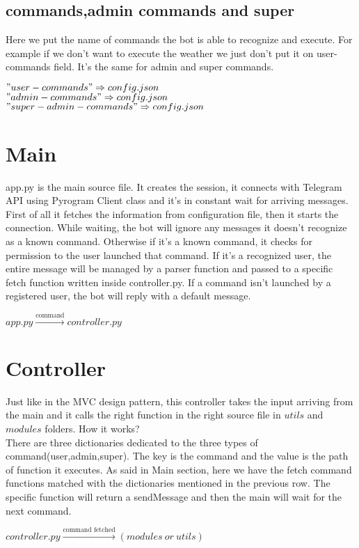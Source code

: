 \documentclass{article}
\begin{document}
\subsection{commands,admin commands and super}
Here we put the name of commands the bot is able to recognize and execute. For example if we don't want to execute the weather we just don't put it on user-commands field. It's the same for admin and super commands.
\begin{center} $"user-commands" \Rightarrow config.json$ \\
               $"admin-commands" \Rightarrow config.json$ \\
               $"super-admin-commands" \Rightarrow config.json$
\end{center}

\section{Main}
app.py is the main source file. It creates the session, it connects with Telegram API using Pyrogram Client class and it's in constant wait for arriving messages.
First of all it fetches the information from configuration file, then it starts the connection.
While waiting, the bot will ignore any messages it doesn't recognize as a known command. Otherwise if it's a known command, it checks for permission to the user launched that command. If it's a recognized user, the entire message will be managed by a parser function and passed to a specific fetch function written inside controller.py.
If a command isn't launched by a registered user, the bot will reply with a default message.
\begin{center} $app.py \xrightarrow{\text{command}} controller.py$ \end{center}

\section{Controller}
Just like in the MVC design pattern, this controller takes the input arriving from the main and it calls the right function in the right source file in $utils$ and $modules$ folders. How it works? \\
There are three dictionaries dedicated to the three types of command(user,admin,super). The key is the command and the value is the path of function it executes. As said in Main section, here we have the fetch command functions matched with the dictionaries mentioned in the previous row. The specific function will return a sendMessage and then the main will wait for the next command.
\begin{center} $controller.py \xrightarrow{\text{command fetched}} (modules \ or \ utils)$ \end{center}
\end{document}
